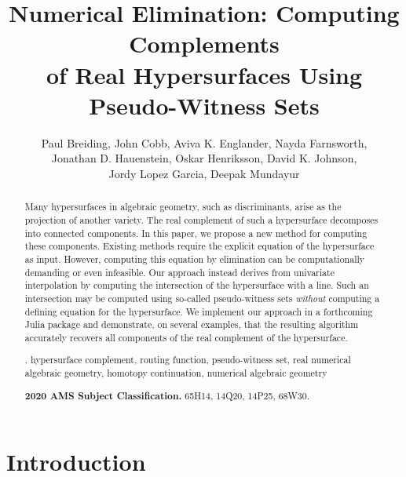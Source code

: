 \documentclass[11pt]{article}
\numberwithin{equation}{section}
\theoremstyle{plain}
\theoremstyle{definition}
\theoremstyle{remark}
\begin{document}
\title{Numerical Elimination: Computing Complements\\ of Real Hypersurfaces Using Pseudo-Witness Sets}

\author{
Paul Breiding,\:
John Cobb,\:
Aviva K. Englander,\:
Nayda Farnsworth,\\
Jonathan D. Hauenstein,\:
Oskar Henriksson,\:
David K. Johnson,\\
Jordy Lopez Garcia,\:
Deepak Mundayur
}


\date{}

\maketitle

\vspace{1em}

\begin{abstract}
\noindent
Many hypersurfaces in algebraic geometry, such as discriminants, arise as the projection of another variety. The real complement of such a hypersurface decomposes into connected components. In this paper, we propose a new method for computing these components. 
Existing methods require the explicit equation of the hypersurface as input.
However, computing this equation by elimination can be computationally demanding or even infeasible.
Our approach instead derives from univariate interpolation 
by computing the intersection of the hypersurface with a line.  
Such an intersection may be computed using so-called pseudo-witness sets \emph{without} computing a defining equation for the hypersurface. 
We implement our approach in a forthcoming Julia package and demonstrate, on several examples, that the resulting algorithm accurately recovers all components of the
real complement of the hypersurface.


\medskip

. hypersurface complement, routing function, pseudo-witness set, real numerical algebraic geometry, homotopy continuation, numerical algebraic geometry

\medskip

\noindent \textbf{2020 AMS Subject Classification.} 65H14, 14Q20, 14P25, 68W30.

\vspace{2em}

\end{abstract}

\section{Introduction}\label{sec:introduction}
\end{document}
